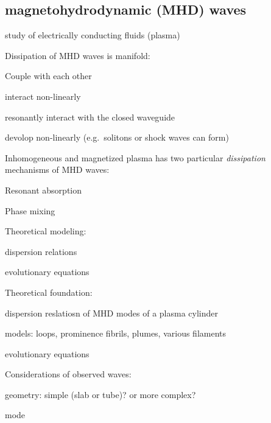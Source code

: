 \documentclass[12pt]{article}
\begin{document}
\subsection*{magnetohydrodynamic (MHD) waves}
\begin{itemize*}
    \item study of electrically conducting fluids (plasma)
    \item Dissipation of MHD waves is manifold:
        \begin{itemize*}
            \item Couple with each other
            \item interact non-linearly
            \item resonantly interact with the closed waveguide
            \item devolop non-linearly (e.g.\ solitons or shock waves
                can form)
        \end{itemize*}
    \item Inhomogeneous and magnetized plasma has two particular
        \emph{dissipation} mechanisms of MHD waves:
        \begin{itemize*}
            \item Resonant absorption
            \item Phase mixing
        \end{itemize*}
    \item Theoretical modeling:
        \begin{itemize*}
            \item dispersion relations
            \item evolutionary equations
        \end{itemize*}
    \item Theoretical foundation:
        \begin{itemize*}
            \item dispersion reslatiosn of MHD modes of a plasma cylinder
            \item models: loops, prominence fibrils, plumes, various filaments
            \item evolutionary equations
        \end{itemize*}
    \item Considerations of observed waves:
        \begin{itemize*}
            \item geometry: simple (slab or tube)? or more complex?
            \item mode

\end{itemize*}
\end{itemize*}
\end{document}
